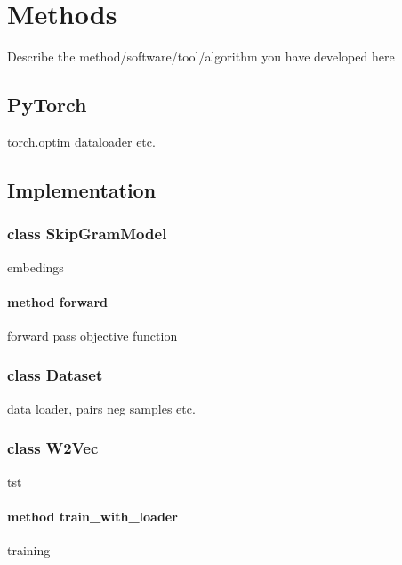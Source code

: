 \chapter{Methods}\label{chap:methods}


Describe the method/software/tool/algorithm you have developed here
\section{PyTorch}
torch.optim dataloader etc. 
\section{Implementation}
\subsection{class SkipGramModel}
embedings
\subsubsection{method forward}
forward pass objective function
\subsection{class Dataset}
data loader, pairs neg samples etc.
\subsection{class W2Vec}
tst
\subsubsection{method train\_with\_loader}
training

